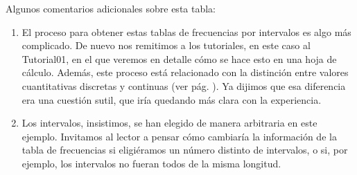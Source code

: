 
Algunos comentarios adicionales sobre esta tabla:
\begin{enumerate}
 \item El proceso para obtener estas tablas de frecuencias por intervalos es algo más complicado. De nuevo nos remitimos a los tutoriales, en este caso al {\sf Tutorial01},
en el que veremos en detalle cómo se hace esto en una hoja de cálculo. Además, este proceso está relacionado con la distinción entre valores
cuantitativas discretas y continuas (ver pág. \pageref{cap01:subsec:VariablesCuantDiscretasContinuas}). Ya dijimos que esa diferencia era una
cuestión sutil, que iría quedando más clara con la experiencia.
  \item Los intervalos, insistimos, se han elegido de manera arbitraria en este ejemplo. Invitamos al lector a pensar cómo cambiaría la
información de la tabla de frecuencias si eligiéramos un número distinto de intervalos, o si, por ejemplo, los intervalos no fueran
todos de la misma longitud.
\end{enumerate}

